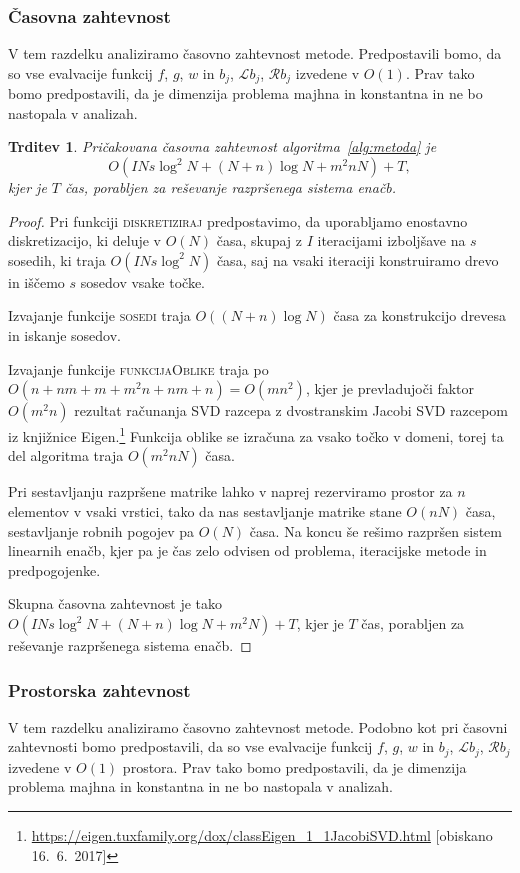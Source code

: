 \documentclass[12pt,a4paper,twoside]{article}
\theoremstyle{definition} %
\theoremstyle{plain} %
\newtheorem{trditev}[definicija]{Trditev}
\numberwithin{equation}{section}
\newcommand{\Rc}{\mathcal{R}}
\renewcommand{\L}{\mathcal{L}}
\begin{document}
\subsubsection{Časovna zahtevnost}
V tem razdelku analiziramo časovno zahtevnost metode. Predpostavili bomo, da so
vse evalvacije funkcij $f$, $g$, $w$ in $b_j$, $\L b_j$, $\Rc b_j$ izvedene v $O(1)$.
Prav tako bomo predpostavili, da je dimenzija problema majhna in konstantna in
ne bo nastopala v analizah.

\begin{trditev}
  Pričakovana časovna zahtevnost algoritma~\ref{alg:metoda} je
  \begin{equation}
    O(I N s \log^2 N + (N+n)\log N + m^2n N) + T,
    \label{eq:casovna-zahtevnost}
  \end{equation}
  kjer je $T$ čas, porabljen za reševanje razpršenega sistema enačb.
\end{trditev}
\begin{proof}
Pri funkciji \textsc{diskretiziraj} predpostavimo, da uporabljamo enostavno
diskretizacijo, ki deluje v $O(N)$ časa, skupaj z $I$ iteracijami izboljšave
na $s$ sosedih, ki traja $O(I N s \log^2 N)$ časa, saj na vsaki iteraciji
konstruiramo drevo in iščemo $s$ sosedov vsake točke.

Izvajanje funkcije \textsc{sosedi} traja $O((N+n) \log N)$ časa za konstrukcijo
drevesa in iskanje sosedov.

Izvajanje funkcije \textsc{funkcijaOblike} traja po $O(n + nm + m + m^2n + nm +
n) = O(mn^2)$, kjer je prevladujoči faktor $O(m^2 n)$ rezultat računanja SVD
razcepa z dvostranskim Jacobi SVD razcepom iz knjižnice
Eigen.\footnote{\url{https://eigen.tuxfamily.org/dox/classEigen_1_1JacobiSVD.html}
[obiskano 16.\ 6.\ 2017]} Funkcija oblike se izračuna za vsako točko v domeni,
torej ta del algoritma traja $O(m^2 n N)$ časa.

Pri sestavljanju razpršene matrike lahko v naprej rezerviramo prostor za $n$
elementov v vsaki vrstici, tako da nas sestavljanje matrike stane $O(nN)$ časa,
sestavljanje robnih pogojev pa $O(N)$ časa. Na koncu še rešimo razpršen sistem
linearnih enačb, kjer pa je čas zelo odvisen od problema, iteracijske metode in
predpogojenke.

Skupna časovna zahtevnost je tako $O(I N s \log^2 N + (N+n)\log N + m^2 N) + T$,
kjer je $T$ čas, porabljen za reševanje razpršenega sistema enačb.
\end{proof}

\subsubsection{Prostorska zahtevnost}
V tem razdelku analiziramo časovno zahtevnost metode. Podobno kot pri časovni
zahtevnosti bomo predpostavili, da so
vse evalvacije funkcij $f$, $g$, $w$ in $b_j$, $\L b_j$, $\Rc b_j$ izvedene v
$O(1)$ prostora.
Prav tako bomo predpostavili, da je dimenzija problema majhna in konstantna in
ne bo nastopala v analizah.
\end{document}
